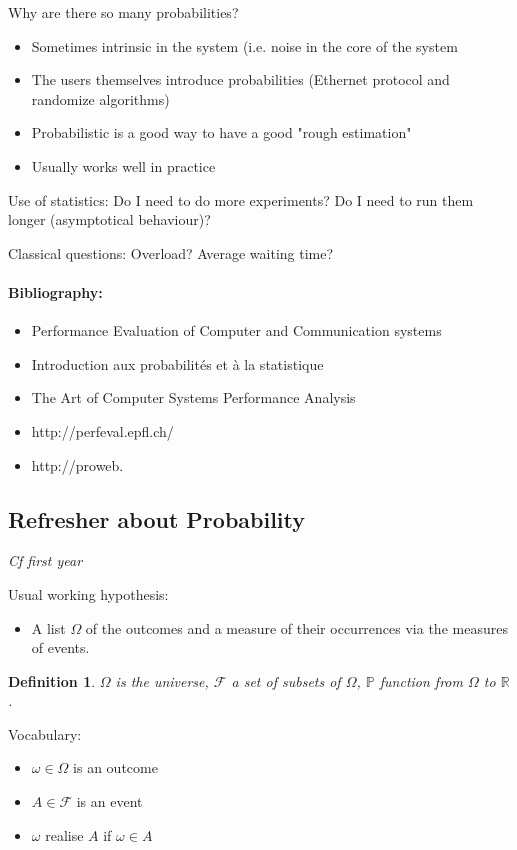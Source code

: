 \documentclass{article}
\newtheorem{defi}{Definition}
\begin{document}
\bigskip
Why are there so many probabilities?
\begin{itemize}
\item Sometimes intrinsic in the system (i.e. noise in the core of the system
\item The users themselves introduce probabilities (Ethernet protocol and randomize algorithms)
\item Probabilistic is a good way to have a good "rough estimation"
\item Usually works well in practice
\end{itemize}

\bigskip
Use of statistics: Do I need to do more experiments? Do I need to run them longer (asymptotical behaviour)?

\bigskip
Classical questions: Overload? Average waiting time?


\bigskip
\paragraph{Bibliography:}
\begin{itemize}
\item Performance Evaluation of Computer and Communication systems
\item Introduction aux probabilités et à la statistique
\item The Art of Computer Systems Performance Analysis
\item http://perfeval.epfl.ch/
\item http://proweb.
\end{itemize}

\subsection{Refresher about Probability}
\textit{Cf first year}

\bigskip

Usual working hypothesis:
\begin{itemize}
\item A list $\Omega$ of the outcomes and a measure of their occurrences via the measures of events.
\end{itemize}


\bigskip
\begin{defi}
$\Omega$ is the universe, $\mathcal{F}$ a set of subsets of $\Omega$, $\mathbb{P}$ function from $\Omega$ to $\mathbb{R}$.
\end{defi}


\bigskip
Vocabulary:
\begin{itemize}
\item $\omega \in \Omega$ is an outcome
\item $A\in \mathcal{F}$ is an event
\item $\omega$ realise $A$ if $\omega\in A$
\end{itemize}
\end{document}
